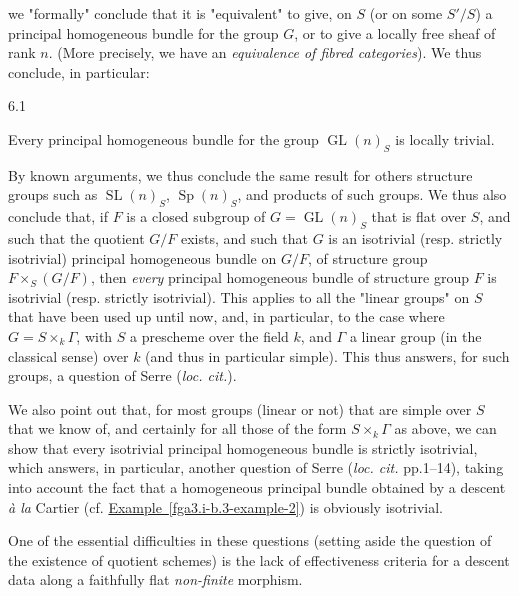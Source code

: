   we "formally" conclude that it is "equivalent" to give, on \(S\) (or on some \(S'/S\)) a principal homogeneous bundle for the group \(G\), or to give a locally free sheaf of rank \(n\).
  (More precisely, we have an \emph{equivalence of fibred categories}).
  We thus conclude, in particular:\begin{proposition}{6.1}\label{fga3.i-b.6-proposition-6.1}\skipsinglepar\par{}Every principal homogeneous bundle for the group \(\operatorname {GL}(n)_S\) is locally trivial.\end{proposition}\par{}By known arguments, we thus conclude the same result for others structure groups such as \(\operatorname {SL}(n)_S\), \(\operatorname {Sp}(n)_S\), and products of such groups.
  We thus also conclude that, if \(F\) is a closed subgroup of \(G=\operatorname {GL}(n)_S\) that is flat over \(S\), and such that the quotient \(G/F\) exists, and such that \(G\) is an isotrivial (resp. strictly isotrivial) principal homogeneous bundle on \(G/F\), of structure group \(F\times _S(G/F)\), then \emph{every} principal homogeneous bundle of structure group \(F\) is isotrivial (resp. strictly isotrivial).
  This applies to all the "linear groups" on \(S\) that have been used up until now, and, in particular, to the case where \(G=S\times _k\Gamma \), with \(S\) a prescheme over the field \(k\), and \(\Gamma \) a linear group (in the classical sense) over \(k\) (and thus in particular simple).
  This thus answers, for such groups, a question of Serre (\emph{loc. cit.}).\par{}We also point out that, for most groups (linear or not) that are simple over \(S\) that we know of, and certainly for all those of the form \(S\times _k\Gamma \) as above, we can show that every isotrivial principal homogeneous bundle is strictly isotrivial, which answers, in particular, another question of Serre (\emph{loc. cit.} pp.1–14), taking into account the fact that a homogeneous principal bundle obtained by a descent \emph{à la} Cartier (cf. \hyperref[fga3.i-b.3-example-2]{Example~\ref*{fga3.i-b.3-example-2}}) is obviously isotrivial.\begin{remark}{}\label{fga3.i-b.6-remark}\skipsinglepar\par{}One of the essential difficulties in these questions (setting aside the question of the existence of quotient schemes) is the lack of effectiveness criteria for a descent data along a faithfully flat \emph{non-finite} morphism.\end{remark}